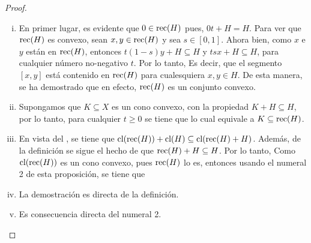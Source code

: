 \begin{proof}$\quad$\vspace{-.2cm}
\begin{enumerate}[i.]
	\item En primer lugar, es evidente que $0\in\mathop{\hbox{\rm rec}}\nolimits(H)$ pues, 
	$0t+H=H$. Para ver que $\mathop{\hbox{\rm rec}}\nolimits(H)$ es convexo, sean
	$x,y\in\mathop{\hbox{\rm rec}}\nolimits(H)$ y sea $s\in[0,1]$. Ahora bien, 
	como $x$ e $y$ están en $\mathop{\hbox{\rm rec}}\nolimits(H)$, entonces
	$t(1-s)y + H \subseteq H$ y $tsx+H\subseteq H$, para
	cualquier número no-negativo $t$. Por lo tanto,
	Es decir, que el segmento $[x,y]$ está contenido en 
	$\mathop{\hbox{\rm rec}}\nolimits(H)$ para cualesquiera $x,y\in H$. De esta manera, 
	se ha demostrado que en efecto, $\mathop{\hbox{\rm rec}}\nolimits(H)$ es un conjunto 
	convexo.
	
	\item Supongamos que $K\subseteq X$ es un cono convexo, 
	con la propiedad $K+H\subseteq H$, por lo tanto, 
	para cualquier $t\geq0$ se tiene que
	lo cual equivale a $K\subseteq\mathop{\hbox{\rm rec}}\nolimits(H)$.
	
	\item En vista del , se tiene que 
	$\mathop{\hbox{\rm cl}}\nolimits(\mathop{\hbox{\rm rec}}\nolimits(H))+\mathop{\hbox{\rm cl}}\nolimits(H)\subseteq\mathop{\hbox{\rm cl}}\nolimits(\mathop{\hbox{\rm rec}}\nolimits(H)+H)$. 
	Además, de la definición se sigue el hecho de que 
	$\mathop{\hbox{\rm rec}}\nolimits(H)+H\subseteq H$. Por lo tanto,
	Como $\mathop{\hbox{\rm cl}}\nolimits(\mathop{\hbox{\rm rec}}\nolimits(H))$ es un cono convexo, pues 
	$\mathop{\hbox{\rm rec}}\nolimits(H)$ lo es, entonces usando el numeral 2 de
	esta proposición, se tiene que 
	
	\item La demostración es directa de la definición.
	
	\item Es consecuencia directa del numeral 2.
\end{enumerate}
\end{proof}


